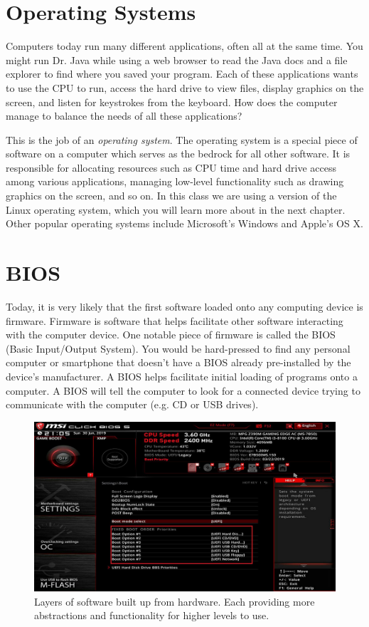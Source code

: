 \section{Operating Systems}

Computers today run many different applications, often all at the same time. You might run Dr. Java while using a web browser to read the Java docs and a file explorer to find where you saved your program. Each of these applications wants to use the CPU to run, access the hard drive to view files, display graphics on the screen, and listen for keystrokes from the keyboard. How does the computer manage to balance the needs of all these applications?

This is the job of an \emph{operating system}. The operating system is a special piece of software on a computer which serves as the bedrock for all other software. It is responsible for allocating resources such as CPU time and hard drive access among various applications, managing low-level functionality such as drawing graphics on the screen, and so on. In this class we are using a version of the Linux operating system, which you will learn more about in the next chapter. Other popular operating systems include Microsoft's Windows and Apple's OS X.

\section{BIOS}

Today, it is very likely that the first software loaded onto any computing device is firmware. Firmware is software that helps facilitate other software interacting with the computer device. One notable piece of firmware is called the BIOS (Basic Input/Output System). You would be hard-pressed to find any personal computer or smartphone that doesn't have a BIOS already pre-installed by the device's manufacturer. A BIOS helps facilitate initial loading of programs onto a computer. A BIOS will tell the computer to look for a connected device trying to communicate with the computer (e.g. CD or USB drives). 

\begin{figure}
    \centering
    \includegraphics[width=12cm]{images/bios.jpg}
    \caption{Layers of software built up from hardware. Each providing more abstractions and functionality for higher levels to use.}
    \label{fig:hw_sw:bios}
\end{figure}

